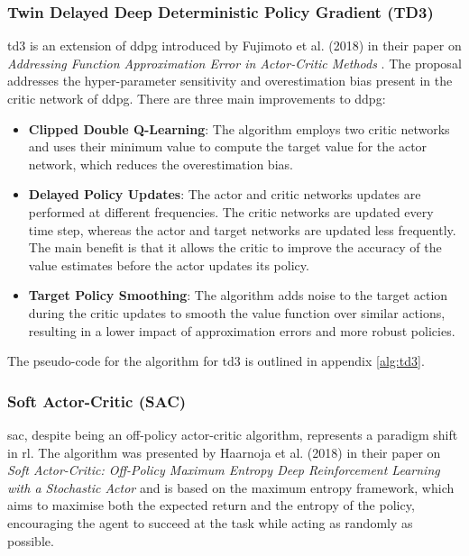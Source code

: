 \subsubsection{Twin Delayed Deep Deterministic Policy Gradient (TD3)} \label{sec:td3}

\acrfull{td3} is an extension of \acrshort{ddpg} introduced by Fujimoto et al. (2018) in their paper on \textit{Addressing Function Approximation Error in Actor-Critic Methods} \cite{Fujimoto2018}. The proposal addresses the hyper-parameter sensitivity and overestimation bias present in the critic network of \acrshort{ddpg}. There are three main improvements to \acrshort{ddpg}:
\begin{itemize}
    \item \textbf{Clipped Double Q-Learning}: The algorithm employs two critic networks and uses their minimum value to compute the target value for the actor network, which reduces the overestimation bias. 
    \item \textbf{Delayed Policy Updates}: The actor and critic networks updates are performed at different frequencies. The critic networks are updated every time step, whereas the actor and target networks are updated less frequently. The main benefit is that it allows the critic to improve the accuracy of the value estimates before the actor updates its policy.
    \item \textbf{Target Policy Smoothing}: The algorithm adds noise to the target action during the critic updates to smooth the value function over similar actions, resulting in a lower impact of approximation errors and more robust policies. 
\end{itemize}

The pseudo-code for the algorithm for \acrshort{td3} is outlined in appendix \ref{alg:td3}.

\subsubsection{Soft Actor-Critic (SAC)} \label{sec:sac}

\acrfull{sac}, despite being an off-policy actor-critic algorithm, represents a paradigm shift in \acrshort{rl}. The algorithm was presented by Haarnoja et al. (2018) in their paper on \textit{Soft Actor-Critic: Off-Policy Maximum Entropy Deep Reinforcement Learning with a Stochastic Actor} \cite{Haarnoja2018} and is based on the maximum entropy framework, which aims to maximise both the expected return and the \gls{entropy} of the policy, encouraging the agent to succeed at the task while acting as randomly as possible. 

